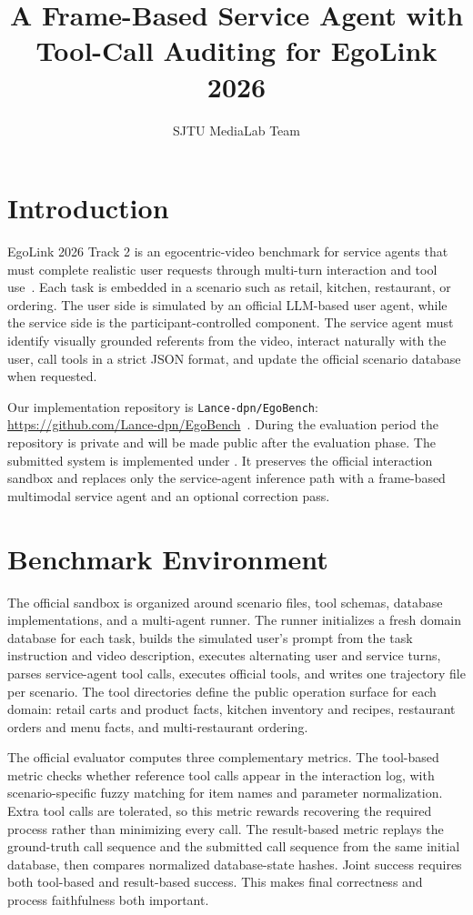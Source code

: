 \documentclass[sigconf,nonacm]{acmart}
\title{A Frame-Based Service Agent with Tool-Call Auditing for EgoLink 2026}
\author{SJTU MediaLab Team}
\affiliation{%
  \institution{SJTU MediaLab}
  \city{Shanghai}
  \country{China}
}
\begin{document}
\maketitle

\section{Introduction}

EgoLink 2026 Track 2 is an egocentric-video benchmark for service agents that
must complete realistic user requests through multi-turn interaction and tool
use~\cite{egolink2026}. Each task is embedded in a scenario such as retail,
kitchen, restaurant, or ordering. The user side is simulated by an official
LLM-based user agent, while the service side is the participant-controlled
component. The service agent must identify visually grounded referents from the
video, interact naturally with the user, call tools in a strict JSON format,
and update the official scenario database when requested.

Our implementation repository is \texttt{Lance-dpn/EgoBench}:
\url{https://github.com/Lance-dpn/EgoBench}~\cite{lanceegobench}. During the
evaluation period the repository is private and will be made public after the
evaluation phase. The submitted system is implemented under
. It preserves the official
interaction sandbox and replaces only the service-agent inference path with a
frame-based multimodal service agent and an optional correction pass.

\section{Benchmark Environment}

The official sandbox is organized around scenario files, tool schemas, database
implementations, and a multi-agent runner. The runner initializes a fresh
domain database for each task, builds the simulated user's prompt from the task
instruction and video description, executes alternating user and service turns,
parses service-agent tool calls, executes official tools, and writes one
trajectory file per scenario. The tool directories define the public operation
surface for each domain: retail carts and product facts, kitchen inventory and
recipes, restaurant orders and menu facts, and multi-restaurant ordering.

The official evaluator computes three complementary metrics. The tool-based
metric checks whether reference tool calls appear in the interaction log, with
scenario-specific fuzzy matching for item names and parameter normalization.
Extra tool calls are tolerated, so this metric rewards recovering the required
process rather than minimizing every call. The result-based metric replays the
ground-truth call sequence and the submitted call sequence from the same
initial database, then compares normalized database-state hashes. Joint success
requires both tool-based and result-based success. This makes final correctness
and process faithfulness both important.
\end{document}
